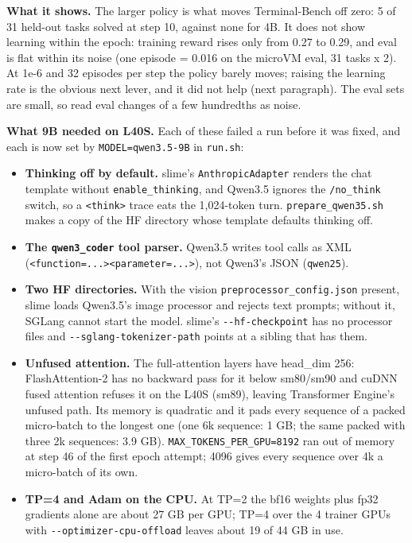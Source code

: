 \documentclass[
  paper=a4,
  ,captions=tableheading
]{scrartcl}
\newcounter{none} %
\providecommand{\tightlist}{%
  \setlength{\itemsep}{0pt}\setlength{\parskip}{0pt}}
\begin{document}
\textbf{What it shows.} The larger policy is what moves Terminal-Bench
off zero: 5 of 31 held-out tasks solved at step 10, against none for 4B.
It does not show learning within the epoch: training reward rises only
from 0.27 to 0.29, and eval is flat within its noise (one episode =
0.016 on the microVM eval, 31 tasks x 2). At 1e-6 and 32 episodes per
step the policy barely moves; raising the learning rate is the obvious
next lever, and it did not help (next paragraph). The eval sets are
small, so read eval changes of a few hundredths as noise.

\textbf{What 9B needed on L40S.} Each of these failed a run before it
was fixed, and each is now set by \texttt{MODEL=qwen3.5-9B} in
\texttt{run.sh}:

\begin{itemize}
\tightlist
\item
  \textbf{Thinking off by default.} slime's \texttt{AnthropicAdapter}
  renders the chat template without \texttt{enable\_thinking}, and
  Qwen3.5 ignores the \texttt{/no\_think} switch, so a
  \texttt{\textless{}think\textgreater{}} trace eats the 1,024-token
  turn. \texttt{prepare\_qwen35.sh} makes a copy of the HF directory
  whose template defaults thinking off.
\item
  \textbf{The \texttt{qwen3\_coder} tool parser.} Qwen3.5 writes tool
  calls as XML
  (\texttt{\textless{}function=...\textgreater{}\textless{}parameter=...\textgreater{}}),
  not Qwen3's JSON (\texttt{qwen25}).
\item
  \textbf{Two HF directories.} With the vision
  \texttt{preprocessor\_config.json} present, slime loads Qwen3.5's
  image processor and rejects text prompts; without it, SGLang cannot
  start the model. slime's \texttt{-\/-hf-checkpoint} has no processor
  files and \texttt{-\/-sglang-tokenizer-path} points at a sibling that
  has them.
\item
  \textbf{Unfused attention.} The full-attention layers have head\_dim
  256: FlashAttention-2 has no backward pass for it below sm80/sm90 and
  cuDNN fused attention refuses it on the L40S (sm89), leaving
  Transformer Engine's unfused path. Its memory is quadratic and it pads
  every sequence of a packed micro-batch to the longest one (one 6k
  sequence: 1 GB; the same packed with three 2k sequences: 3.9 GB).
  \texttt{MAX\_TOKENS\_PER\_GPU=8192} ran out of memory at step 46 of
  the first epoch attempt; 4096 gives every sequence over 4k a
  micro-batch of its own.
\item
  \textbf{TP=4 and Adam on the CPU.} At TP=2 the bf16 weights plus fp32
  gradients alone are about 27 GB per GPU; TP=4 over the 4 trainer GPUs
  with \texttt{-\/-optimizer-cpu-offload} leaves about 19 of 44 GB in
  use.
\end{itemize}
\end{document}
